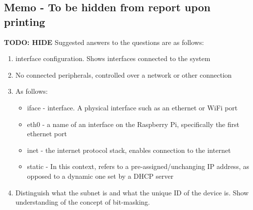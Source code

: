 \subsection{Memo - To be hidden from report upon printing}
\textbf{TODO: HIDE}
Suggested answers to the questions are as follows:
\begin{enumerate}
    \item interface configuration. Shows interfaces connected to the system
    \item No connected peripherals, controlled over a network or other connection
    \item As follows:
        \begin{itemize}
            \item iface - interface. A physical interface such as an ethernet or WiFi port
            \item eth0 - a name of an interface on the Raspberry Pi, specifically the first ethernet port
            \item inet - the internet protocol stack, enables connection to the internet
            \item static - In this context, refers to a pre-assigned/unchanging IP address, as opposed to a dynamic one set by a DHCP server
        \end{itemize}
    \item Distinguish what the subnet is and what the unique ID of the device is. Show understanding of the concept of bit-masking.
\end{enumerate}